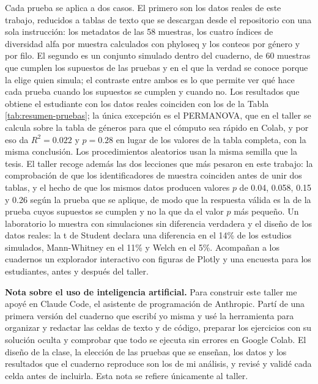 Cada prueba se aplica a dos casos. El primero son los datos reales de este trabajo, reducidos a
tablas de texto que se descargan desde el repositorio con una sola instrucción: los metadatos de las
58 muestras, los cuatro índices de diversidad alfa por muestra calculados con phyloseq y los conteos
por género y por filo. El segundo es un conjunto simulado dentro del cuaderno, de 60 muestras que
cumplen los supuestos de las pruebas y en el que la verdad se conoce porque la elige quien simula; el
contraste entre ambos es lo que permite ver qué hace cada prueba cuando los supuestos se cumplen y
cuando no. Los resultados que obtiene el estudiante con los datos reales coinciden con los de la
Tabla \ref{tab:resumen-pruebas}; la única excepción es el PERMANOVA, que en el taller se calcula
sobre la tabla de géneros para que el cómputo sea rápido en Colab, y por eso da $R^2 = 0.022$ y
$p = 0.28$ en lugar de los valores de la tabla completa, con la misma conclusión. Los procedimientos
aleatorios usan la misma semilla que la tesis. El taller recoge además las dos lecciones que más pesaron en este trabajo: la comprobación de
que los identificadores de muestra coinciden antes de unir dos tablas, y el hecho de que los mismos
datos producen valores $p$ de 0.04, 0.058, 0.15 y 0.26 según la prueba que se aplique, de modo que la
respuesta válida es la de la prueba cuyos supuestos se cumplen y no la que da el valor $p$ más
pequeño. Un laboratorio lo muestra con simulaciones sin diferencia verdadera y el diseño de los datos
reales: la t de Student declara una diferencia en el 14\% de los estudios simulados, Mann-Whitney en
el 11\% y Welch en el 5\%. Acompañan a los cuadernos un explorador interactivo con figuras de Plotly
y una encuesta para los estudiantes, antes y después del taller.

\textbf{Nota sobre el uso de inteligencia artificial.} Para construir este taller me apoyé en
Claude Code, el asistente de programación de Anthropic. Partí de una primera versión del cuaderno
que escribí yo misma y usé la herramienta para organizar y redactar las celdas de texto y de código,
preparar los ejercicios con su solución oculta y comprobar que todo se ejecuta sin errores en Google
Colab. El diseño de la clase, la elección de las pruebas que se enseñan, los datos y los resultados
que el cuaderno reproduce son los de mi análisis, y revisé y validé cada celda antes de incluirla.
Esta nota se refiere únicamente al taller.
